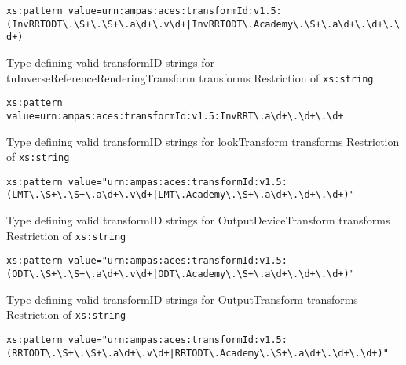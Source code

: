             \begin{adjustwidth}{5mm}{}            
            \lstinline{xs:pattern value=urn:ampas:aces:transformId:v1.5:(InvRRTODT\.\S+\.\S+\.a\d+\.v\d+|InvRRTODT\.Academy\.\S+\.a\d+\.\d+\.\d+)}
            \end{adjustwidth}
            
            {Type defining valid transformID strings for tnInverseReferenceRenderingTransform transforms}
            {Restriction of \texttt{xs:string}}

            \begin{adjustwidth}{5mm}{}            
            \lstinline{xs:pattern value=urn:ampas:aces:transformId:v1.5:InvRRT\.a\d+\.\d+\.\d+}
            \end{adjustwidth}

            {Type defining valid transformID strings for lookTransform transforms}
            {Restriction of \texttt{xs:string}}

            \begin{adjustwidth}{5mm}{}            
            \lstinline{xs:pattern value="urn:ampas:aces:transformId:v1.5:(LMT\.\S+\.\S+\.a\d+\.v\d+|LMT\.Academy\.\S+\.a\d+\.\d+\.\d+)"}
            \end{adjustwidth}

            {Type defining valid transformID strings for OutputDeviceTransform transforms}
            {Restriction of \texttt{xs:string}}
            
            \begin{adjustwidth}{5mm}{}            
            \lstinline{xs:pattern value="urn:ampas:aces:transformId:v1.5:(ODT\.\S+\.\S+\.a\d+\.v\d+|ODT\.Academy\.\S+\.a\d+\.\d+\.\d+)"}
            \end{adjustwidth}

            {Type defining valid transformID strings for OutputTransform transforms}
            {Restriction of \texttt{xs:string}}

            \begin{adjustwidth}{5mm}{}            
            \lstinline{xs:pattern value="urn:ampas:aces:transformId:v1.5:(RRTODT\.\S+\.\S+\.a\d+\.v\d+|RRTODT\.Academy\.\S+\.a\d+\.\d+\.\d+)"}
            \end{adjustwidth}

